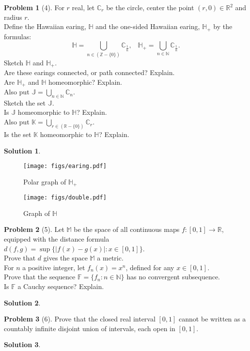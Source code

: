 \documentclass{article}
\theoremstyle{definition}
\newtheorem*{soln}{Solution}
\newtheorem*{prob}{Problem}
\theoremstyle{theorem}
\newcommand{\HP}{\mathbb{H}}
\begin{document}
\begin{prob}[4]
For $r$ real, let $\mathbb{C}_r$ be the circle, center the point  $(r, 0) \in \mathbb{R}^2$ and radius $r$. \\ Define the Hawaiian earing, $\mathbb{H}$ and the one-sided Hawaiian earing, $\mathbb{H}_+$ by the formulas:
\[ \mathbb{H} =   \bigcup_{n \in (\mathbb{Z} - \{0\})} \mathbb{C}_{\frac{1}{n}}, \hspace{10pt} \mathbb{H}_+ =   \bigcup_{n \in \mathbb{N}} \mathbb{C}_{\frac{1}{n}}. \] 
Sketch $\mathbb{H}$ and $\mathbb{H}_+$.\\
Are these earings connected, or path connected? Explain. \\
Are $\mathbb{H}_+$ and $\mathbb{H}$ homeomorphic? Explain.\\
Also put $\mathbb{J} =  \bigcup_{n \in \mathbb{N}} \mathbb{C}_{n}$.\\
Sketch the set $\mathbb{J}$.\\
Is $\mathbb{J}$ homeomorphic to $\mathbb{H}$? Explain.\\
Also put $\mathbb{K} =  \bigcup_{r \in (\mathbb{R} - \{0\})} \mathbb{C}_{r}$.\\
Is the set $\mathbb{K}$ homeomorphic to $\mathbb{H}$? Explain.


\end{prob}
\begin{soln}

            \begin{figure}
  \centering
    \texttt{[image: figs/earing.pdf]}
  \caption{Polar graph of $\HP_+$}
\end{figure}
            \begin{figure}
  \centering
    \texttt{[image: figs/double.pdf]}
                \caption{Graph of $\HP$}
\end{figure}
\end{soln}
\vspace{1in}


\begin{prob}[5]
Let $\mathbb{M}$ be the space of all continuous maps $f:[0, 1] \rightarrow \mathbb{R}$, equipped with the distance formula $d(f,g ) =  \sup\{ |f(x) - g(x)|:  x \in [0, 1]\}$.  \\Prove that $d$ gives the space $\mathbb{M}$ a metric.   \\For $n$ a positive integer, let $f_n(x) = x^n$, defined for any $x\in [0, 1]$. \\ Prove that the sequence $\mathbb{F} = \{f_n: n \in \mathbb{N}\}$ has no convergent subsequence. \\ Is $\mathbb{F}$ a Cauchy sequence? Explain. 
\end{prob}
\begin{soln}

\end{soln}
\vspace{1in}


\begin{prob}[6]
Prove that the closed real interval $[0, 1]$ cannot be written as a countably infinite disjoint union of intervals, each open in $[0, 1]$. 
\end{prob}
\begin{soln}

\end{soln}
\vspace{1in}
\end{document}
